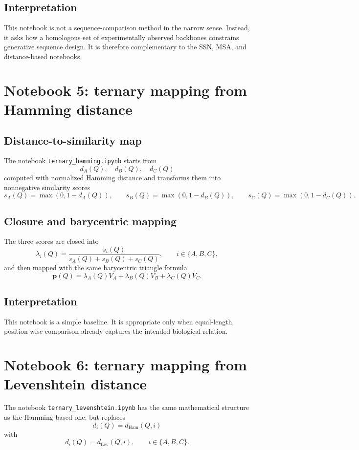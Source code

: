 \documentclass[11pt,a4paper]{article}
\begin{document}
\subsection{Interpretation}

This notebook is not a sequence-comparison method in the narrow sense. Instead, it asks how a homologous set of experimentally observed backbones constrains generative sequence design. It is therefore complementary to the SSN, MSA, and distance-based notebooks.

\section{Notebook 5: ternary mapping from Hamming distance}

\subsection{Distance-to-similarity map}

The notebook \texttt{ternary\_hamming.ipynb} starts from
\[
d_A(Q),\quad d_B(Q),\quad d_C(Q)
\]
computed with normalized Hamming distance and transforms them into nonnegative similarity scores
\[
s_A(Q)=\max(0,1-d_A(Q)),\qquad
s_B(Q)=\max(0,1-d_B(Q)),\qquad
s_C(Q)=\max(0,1-d_C(Q)).
\]

\subsection{Closure and barycentric mapping}

The three scores are closed into
\[
\lambda_i(Q)=\frac{s_i(Q)}{s_A(Q)+s_B(Q)+s_C(Q)},\qquad i\in\{A,B,C\},
\]
and then mapped with the same barycentric triangle formula
\[
\bm{p}(Q)=\lambda_A(Q)V_A+\lambda_B(Q)V_B+\lambda_C(Q)V_C.
\]

\subsection{Interpretation}

This notebook is a simple baseline. It is appropriate only when equal-length, position-wise comparison already captures the intended biological relation.

\section{Notebook 6: ternary mapping from Levenshtein distance}

The notebook \texttt{ternary\_levenshtein.ipynb} has the same mathematical structure as the Hamming-based one, but replaces
\[
d_i(Q)=d_{\mathrm{Ham}}(Q,i)
\]
with
\[
d_i(Q)=d_{\mathrm{Lev}}(Q,i),\qquad i\in\{A,B,C\}.
\]
\end{document}
